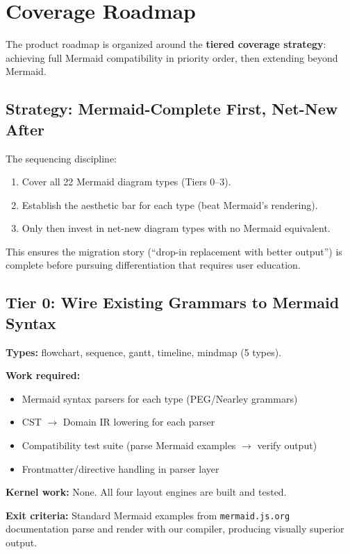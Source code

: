 \section{Coverage Roadmap}
\label{sec:roadmap}

The product roadmap is organized around the \textbf{tiered coverage strategy}: achieving
full Mermaid compatibility in priority order, then extending beyond Mermaid.

\subsection{Strategy: Mermaid-Complete First, Net-New After}

The sequencing discipline:
\begin{enumerate}
  \item Cover all 22 Mermaid diagram types (Tiers 0--3).
  \item Establish the aesthetic bar for each type (beat Mermaid's rendering).
  \item Only then invest in net-new diagram types with no Mermaid equivalent.
\end{enumerate}

This ensures the migration story (``drop-in replacement with better output'') is complete
before pursuing differentiation that requires user education.

\subsection{Tier 0: Wire Existing Grammars to Mermaid Syntax}

\textbf{Types:} flowchart, sequence, gantt, timeline, mindmap (5 types).

\textbf{Work required:}
\begin{itemize}
  \item Mermaid syntax parsers for each type (PEG/Nearley grammars)
  \item CST $\to$ Domain IR lowering for each parser
  \item Compatibility test suite (parse Mermaid examples $\to$ verify output)
  \item Frontmatter/directive handling in parser layer
\end{itemize}

\textbf{Kernel work:} None. All four layout engines are built and tested.

\textbf{Exit criteria:} Standard Mermaid examples from \texttt{mermaid.js.org} documentation
parse and render with our compiler, producing visually superior output.


